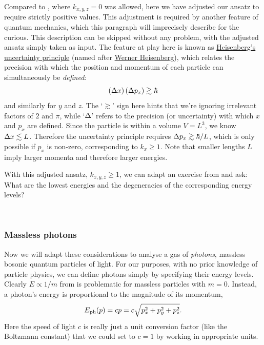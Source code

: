 Compared to , where $k_{x, y, z} = 0$ was allowed, here we have adjusted our ansatz to require strictly positive values.
This adjustment is required by another feature of quantum mechanics, which this paragraph will imprecisely describe for the curious.
This description can be skipped without any problem, with the adjusted ansatz simply taken as input.
The feature at play here is known as \href{https://en.wikipedia.org/wiki/Uncertainty_principle}{Heisenberg's uncertainty principle} (named after \href{https://en.wikipedia.org/wiki/Werner_Heisenberg}{Werner Heisenberg}), which relates the precision with which the position and momentum of each particle can simultaneously be \emph{defined}:
\begin{equation*}
  \left(\Delta x\right) \left(\Delta p_x\right) \gtrsim \hbar
\end{equation*}
and similarly for $y$ and $z$.
The `$\gtrsim$' sign here hints that we're ignoring irrelevant factors of $2$ and $\pi$, while `$\Delta$' refers to the precision (or uncertainty) with which $x$ and $p_x$ are defined.
Since the particle is within a volume $V = L^3$, we know $\Delta x \lesssim L$.
Therefore the uncertainty principle requires $\Delta p_x \gtrsim \hbar / L$, which is only possible if $p_x$ is non-zero, corresponding to $k_x \geq 1$.
Note that smaller lengths $L$ imply larger momenta and therefore larger energies.

With this adjusted ansatz, $k_{x, y, z} \geq 1$, we can adapt an exercise from  and ask: What are the lowest energies and the degeneracies of the corresponding energy levels?
\begin{mdframed}
  \ \\[100 pt]
\end{mdframed}

\subsubsection{Massless photons}
Now we will adapt these considerations to analyse a gas of \textit{photons}, massless bosonic quantum particles of light.
For our purposes, with no prior knowledge of particle physics, we can define photons simply by specifying their energy levels.
Clearly $E \propto 1 / m$ from  is problematic for massless particles with $m = 0$.
Instead, a photon's energy is proportional to the magnitude of its momentum,
\begin{equation*}
  E_{\text{ph}}(p) = cp = c \sqrt{p_x^2 + p_y^2 + p_z^2}.
\end{equation*}
Here the speed of light $c$ is really just a unit conversion factor (like the Boltzmann constant) that we could set to $c = 1$ by working in appropriate units.

